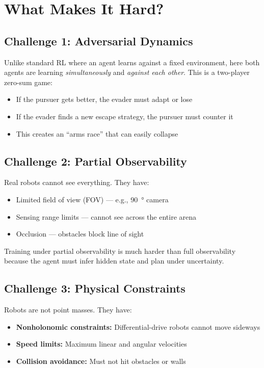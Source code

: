 \documentclass[11pt,a4paper]{report}
\begin{document}
\section{What Makes It Hard?}

\subsection{Challenge 1: Adversarial Dynamics}
Unlike standard RL where an agent learns against a fixed environment, here both agents are learning \emph{simultaneously} and \emph{against each other}. This is a two-player zero-sum game:
\begin{itemize}
    \item If the pursuer gets better, the evader must adapt or lose
    \item If the evader finds a new escape strategy, the pursuer must counter it
    \item This creates an ``arms race'' that can easily collapse
\end{itemize}

\subsection{Challenge 2: Partial Observability}
Real robots cannot see everything. They have:
\begin{itemize}
    \item Limited field of view (FOV) --- e.g., \SI{90}{\degree} camera
    \item Sensing range limits --- cannot see across the entire arena
    \item Occlusion --- obstacles block line of sight
\end{itemize}
Training under partial observability is much harder than full observability because the agent must infer hidden state and plan under uncertainty.

\subsection{Challenge 3: Physical Constraints}
Robots are not point masses. They have:
\begin{itemize}
    \item \textbf{Nonholonomic constraints:} Differential-drive robots cannot move sideways
    \item \textbf{Speed limits:} Maximum linear and angular velocities
    \item \textbf{Collision avoidance:} Must not hit obstacles or walls
\end{itemize}
\end{document}
